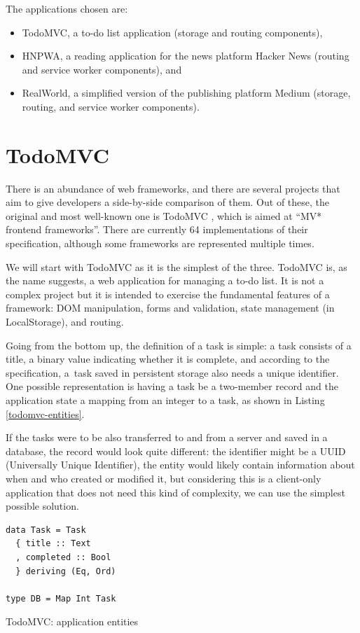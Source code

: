 \documentclass[english,zadani,odsaz]{fitthesis}
\begin{document}
The applications chosen are:
\begin{itemize}
\item TodoMVC, a to-do list application (storage and routing components),
\item HNPWA, a reading application for the news platform Hacker News (routing and
service worker components), and
\item RealWorld, a simplified version of the publishing platform Medium (storage,
routing, and service worker components).
\end{itemize}

\section{TodoMVC}
\label{sec:orgc48adb6}
There is an abundance of web frameworks, and there are several projects that aim
to give developers a side-by-side comparison of them. Out of these, the original
and most well-known one is TodoMVC \cite{todomvc}, which is aimed at ``MV* frontend
frameworks''. There are currently 64 implementations of their specification, although
some frameworks are represented multiple times.

We will start with TodoMVC as it is the simplest of the three. TodoMVC is, as
the name suggests, a web application for managing a to-do list. It is not a
complex project but it is intended to exercise the fundamental features of a
framework: DOM manipulation, forms and validation, state management (in
LocalStorage), and routing.

Going from the bottom up, the definition of a task is simple: a task consists of
a title, a binary value indicating whether it is complete, and according to the
specification, a~task saved in persistent storage also needs a unique
identifier. One possible representation is having a task be a two-member record
and the application state a mapping from an integer to a task, as shown in
Listing \ref{todomvc-entities}.

If the tasks were to be also transferred to and from a server and saved in a
database, the record would look quite different: the identifier might be a UUID
(Universally Unique Identifier), the entity would likely contain information
about when and who created or modified it, but considering this is a client-only
application that does not need this kind of complexity, we can use the simplest
possible solution.

\begin{listing}[tb]
\begin{verbatim}
data Task = Task
  { title :: Text
  , completed :: Bool
  } deriving (Eq, Ord)

type DB = Map Int Task
\end{verbatim}
\caption{TodoMVC: application entities \label{todomvc-entities}}
\end{listing}
\end{document}
